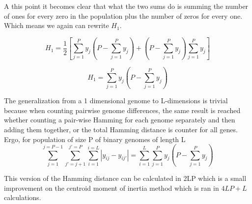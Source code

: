 A this point it becomes clear that what the two sums do is summing the number of ones for every zero in the population plus the number of zeros for every one. Which means we again can rewrite \(H_{1}\). 

\begin{equation*}
    H_{1} = \frac{1}{2}\left [\sum_{j=1}^{P}y_{j}\left (P - \sum_{j=1}^{P}y_{j} \right) + \left (P - \sum_{j=1}^{P}y_{j} \right)\sum_{j=1}^{P}y_{j}\right ]
\end{equation*}

\begin{equation}
    \label{eq:linearHamming}
    H_{1} = \sum_{j=1}^{P}y_{j}\left (P - \sum_{j=1}^{P}y_{j} \right)
\end{equation}

The generalization from a 1 dimensional genome to L-dimensions is trivial because when counting pairwise genome differences, the same result is reached whether counting a pair-wise Hamming for each genome separately and then adding them together, or the total Hamming distance is counter for all genes. Ergo, for population of size P of binary genomes of length L
\begin{equation}
    \label{eq:proved}
    \sum_{j=1}^{j=P-1}\sum_{{j}'=j+1}^{{j}'=P}\sum_{i=1}^{i=L}\left |y_{ij}-y_{i{j}'}\right | = \sum_{i=1}^{L}\sum_{j=1}^{P}y_{j}\left (P - \sum_{j=1}^{P}y_{j} \right)
\end{equation}

This version of the Hamming distance can be calculated in 2LP which is a small improvement on the centroid moment of inertia method which is ran in \(4LP + L\) calculations. 



